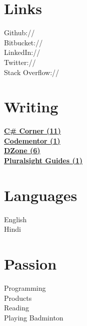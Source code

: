\documentclass[]{gagan-resume}
\begin{document}
\begin{minipage}[t]{0.33\textwidth}
\section{Links} 
Github:// \href{https://github.com/sikrigagan}{} \\
Bitbucket:// \href{https://bitbucket.org/sikrigagan}{} \\
LinkedIn://  \href{https://www.linkedin.com/in/sikrigagan}{} \\
Twitter://  \href{https://twitter.com/sikrigagan}{} \\
Stack Overflow://  \href{https://stackoverflow.com/users/4129965/sikrigagan}{}
\sectionsep



\section{Writing} 
\textbf{\href{http://www.c-sharpcorner.com/members/gagan-sikri}{C\# Corner (11)}}\\
\textbf{\href{https://www.codementor.io/sikrigagan}{Codementor (1)}}\\
\textbf{\href{https://dzone.com/users/2733735/sikrigagan.html}{DZone (6)}}\\
\textbf{\href{https://www.pluralsight.com/guides/author/sikrigagan}{Pluralsight Guides (1)}}\\
\sectionsep




\section{Languages}
English \\
Hindi \\
\sectionsep





\section{Passion}
Programming \\
Products \\
Reading \\
Playing Badminton \\
\sectionsep



\end{minipage} 
\end{document}
